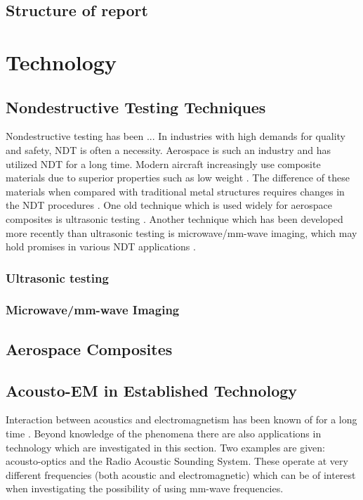 \documentclass[10pt,a4paper]{eitExjobb}
\begin{document}
	\section{Structure of report}
	
	\chapter{Technology \label{sh:tech}}
	
	\section{Nondestructive Testing Techniques}
	Nondestructive testing has been ... In industries with high demands for quality and safety, NDT is often a necessity. Aerospace is such an industry and has utilized NDT for a long time.  Modern aircraft increasingly use composite materials due to superior properties such as low weight \cite{Katunin2015}. The difference of these materials when compared with traditional metal structures requires changes in the NDT procedures \cite{Riegert2006}. One old technique which is used widely for aerospace composites is ultrasonic testing \cite{Garnier2011}. Another technique which has been developed more recently than ultrasonic testing is microwave/mm-wave imaging, which may hold promises in various NDT applications \cite{Kharkovsky2007}.
	
	\subsection{Ultrasonic testing}
	
	\subsection{Microwave/mm-wave Imaging}
	
	\section{Aerospace Composites}
	
	\section{Acousto-EM in Established Technology}
	Interaction between acoustics and electromagnetism has been known of for a long time . Beyond knowledge of the phenomena there are also applications in technology which are investigated in this section. Two examples are given: acousto-optics and the Radio Acoustic Sounding System. These operate at very different frequencies (both acoustic and electromagnetic) which can be of interest when investigating the possibility of using mm-wave frequencies.
	
\end{document}
